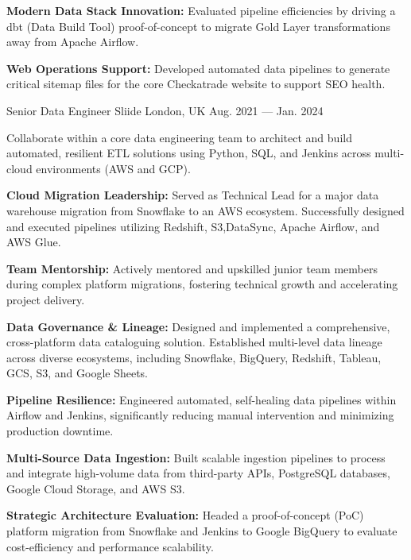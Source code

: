 \begin{cventries}
{\begin{cvitems}
      \item {\textbf{Modern Data Stack Innovation:} Evaluated pipeline efficiencies by driving a dbt (Data Build Tool) proof-of-concept to migrate Gold Layer transformations away from Apache Airflow.}
      \item {\textbf{Web Operations Support:} Developed automated data pipelines to generate critical sitemap files for the core Checkatrade website to support SEO health.}
    \end{cvitems}
  }

  \cventry
  {Senior Data Engineer} %
  {Sliide } %
  {London, UK} %
  {Aug. 2021 --- Jan. 2024} %
  {
    \begin{cvitems} %
      \item {Collaborate within a core data engineering team to architect and build automated, resilient ETL solutions using Python, SQL, and Jenkins across multi-cloud environments (AWS and GCP).}
      \item {\textbf{Cloud Migration Leadership:} Served as Technical Lead for a major data warehouse migration from Snowflake to an AWS ecosystem. Successfully designed and executed pipelines utilizing Redshift, S3,DataSync, Apache Airflow, and AWS Glue.}
      \item {\textbf{Team Mentorship:} Actively mentored and upskilled junior team members during complex platform migrations, fostering technical growth and accelerating project delivery.}
      \item {\textbf{Data Governance \& Lineage:} Designed and implemented a comprehensive, cross-platform data cataloguing solution. Established multi-level data lineage across diverse ecosystems, including Snowflake, BigQuery, Redshift, Tableau, GCS, S3, and Google Sheets.}
      \item {\textbf{Pipeline Resilience:} Engineered automated, self-healing data pipelines within Airflow and Jenkins, significantly reducing manual intervention and minimizing production downtime.}
      \item {\textbf{Multi-Source Data Ingestion:} Built scalable ingestion pipelines to process and integrate high-volume data from third-party APIs, PostgreSQL databases, Google Cloud Storage, and AWS S3.}
      \item {\textbf{Strategic Architecture Evaluation:} Headed a proof-of-concept (PoC) platform migration from Snowflake and Jenkins to Google BigQuery to evaluate cost-efficiency and performance scalability.}
    \end{cvitems}
  }


\end{cventries}
